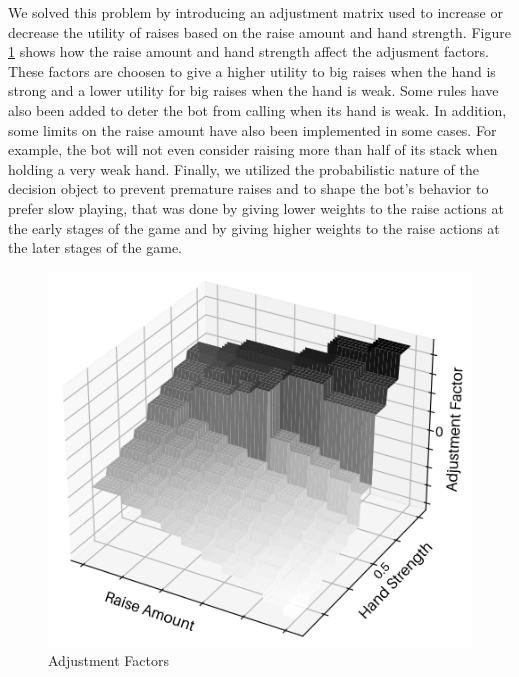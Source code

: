 We solved this problem by introducing an adjustment matrix used to increase or decrease the utility of raises based on the raise amount and hand strength. Figure \ref{fig:adfactors} shows how the raise amount and hand strength affect the adjusment factors. These factors are choosen to give a higher utility to big raises when the hand is strong and a lower utility for big raises when the hand is weak. Some rules have also been added to deter the bot from calling when its hand is weak. In addition, some limits on the raise amount have also been implemented in some cases.
For example, the bot will not even consider raising more than half of its stack when holding a very weak hand. Finally, we utilized the probabilistic nature of the decision object to prevent premature raises and to shape the bot's behavior to prefer slow playing, that was done by giving lower weights to the raise actions at the early stages of the game and by giving higher weights to the raise actions at the later stages of the game.

\begin{figure}[h] 
    \centering
    \includegraphics[width=\textwidth/2]{graphics/adfactors.png}
    \caption{Adjustment Factors}
    \label{fig:adfactors}
\end{figure}

